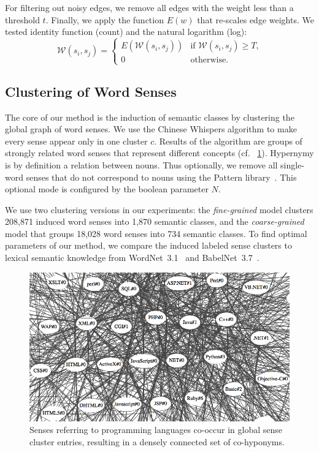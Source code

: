 \documentclass[10pt, a4paper]{article}
\begin{document}
For filtering out noisy edges, we remove all edges with the weight less than a threshold $t$. Finally, we apply the function $E(w)$ that re-scales edge weights. We tested identity function (count) and the natural logarithm (log):
%
\begin{equation}
\mathcal{W}(s_i, s_j) =
  \begin{cases}
  E(\mathcal{W}(s_i, s_j)) & \text{if } \mathcal{W}(s_i, s_j) \geq T\text{,} \\
  0                        & \text{otherwise.}
  \end{cases}
\end{equation}

\subsection{Clustering of Word Senses}

The core of our method is the induction of semantic classes by clustering the global graph of word senses. We use the Chinese Whispers algorithm to make every sense appear only in one cluster $c$. Results of the algorithm are groups of strongly related word senses that represent different concepts (cf. \figurename~\ref{fig:cluster-programming}). 
Hypernymy is by definition a relation between nouns. Thus optionally, we remove all single-word senses that do not correspond to nouns using the Pattern library~\cite{DeSmedt:12}. This optional mode is configured by the boolean parameter $N$. 

We use two clustering versions in our experiments: the \textit{fine-grained} model clusters 208,871 induced word senses into 1,870 semantic classes, and the \textit{coarse-grained} model that groups 18,028 word senses into 734 semantic classes. To find optimal parameters of our method, we compare the induced labeled sense clusters to lexical semantic knowledge from WordNet~3.1~\cite{Fellbaum:98}
and BabelNet~3.7~\cite{navigli2012babelnet}.


\begin{figure}[ht]
  \centering
  \includegraphics[width=.5\textwidth]{figures/cluster-programming}
  \caption{Senses referring to programming languages co-occur in global sense cluster entries, resulting in a densely connected set of co-hyponyms. }
  \label{fig:cluster-programming}
\end{figure}
\end{document}
